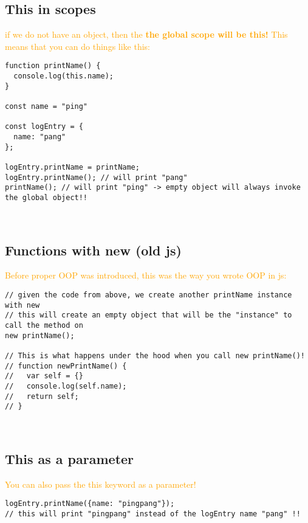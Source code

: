 \documentclass[main.tex,fontsize=6pt,paper=a4,paper=landscape,DIV=calc,]{scrartcl}
\begin{document}
\begin{multicols*}{4}
\subsection{This in scopes}  
\textcolor{orange}{if we do not have an object, then the \textbf{the global scope will be this!}\newline
This means that you can do things like this:}\newline
\begin{lstlisting}
function printName() {
  console.log(this.name);
}

const name = "ping"

const logEntry = {
  name: "pang"
};

logEntry.printName = printName;
logEntry.printName(); // will print "pang"
printName(); // will print "ping" -> empty object will always invoke the global object!!
\end{lstlisting}
\, \newline

\subsection{Functions with new (old js)}  
\textcolor{orange}{Before proper OOP was introduced, this was the way you wrote OOP in js:}\newline
\begin{lstlisting}
// given the code from above, we create another printName instance with new
// this will create an empty object that will be the "instance" to call the method on
new printName();

// This is what happens under the hood when you call new printName()!
// function newPrintName() {
//   var self = {}
//   console.log(self.name);
//   return self;
// }
\end{lstlisting}
\, \newline

\subsection{This as a parameter}  
\textcolor{orange}{You can also pass the this keyword as a parameter!}\newline
\begin{lstlisting}
logEntry.printName({name: "pingpang"});
// this will print "pingpang" instead of the logEntry name "pang" !!
\end{lstlisting}
\, \newline


\end{multicols*}
\end{document}
